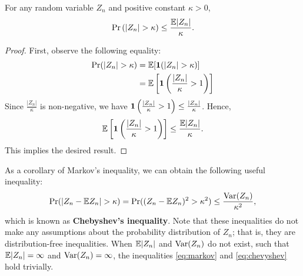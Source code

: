 \documentclass[11pt, A4paper, openany, uplatex]{book}
\begin{document}
\begin{lemma}\label{markov}
	For any random variable $Z_n$ and positive constant $\kappa > 0$,
	\begin{equation}\label{eq:markov}
	\Pr\left( |Z_n| > \kappa \right) \leq \frac{\mathbb{E}|Z_n|}{\kappa}.
	\end{equation}
\end{lemma}

\begin{proof}
	First, observe the following equality:
	\begin{align*}
	\Pr( |Z_n| > \kappa ) 
	& = \mathbb{E}[\mathbf{1}(|Z_n| > \kappa )] \\
	& = \mathbb{E}\left[\mathbf{1}\left(\frac{|Z_n|}{\kappa} > 1 \right)\right]
	\end{align*}
	Since $\frac{|Z_n|}{\kappa}$ is non-negative, we have $\mathbf{1}\left(\frac{|Z_n|}{\kappa} > 1 \right) \le \frac{|Z_n|}{\kappa}$.
	Hence,
	\begin{align*}
	\mathbb{E}\left[\mathbf{1}\left(\frac{|Z_n|}{\kappa} > 1 \right)\right] \le \frac{\mathbb{E}|Z_n|}{\kappa}.
	\end{align*}
	This implies the desired result.
\end{proof}

As a corollary of Markov's inequality, we can obtain the following useful inequality:
\begin{align}\label{eq:chevyshev}
\Pr( |Z_n - \mathbb{E} Z_n | > \kappa ) = \Pr( (Z_n - \mathbb{E} Z_n)^2 > \kappa^2 ) \leq \frac{\mathrm{Var}(Z_n)}{\kappa^2},
\end{align}
which is known as \textbf{Chebyshev's inequality}.
Note that these inequalities do not make any assumptions about the probability distribution of $Z_n$; that is, they are distribution-free inequalities.
When $\mathbb{E} |Z_n|$ and $\mathrm{Var}(Z_n)$ do not exist, such that $\mathbb{E} |Z_n| = \infty$ and $\mathrm{Var}(Z_n) = \infty$, the inequalities  \eqref{eq:markov} and \eqref{eq:chevyshev} hold trivially.
\bigskip
\end{document}
